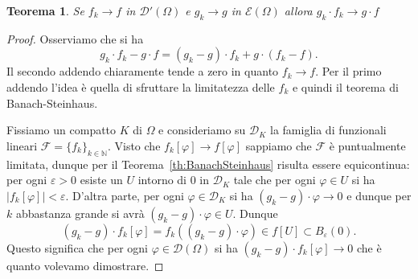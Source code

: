 \documentclass[italian,a4paper,oneside,headinclude]{scrbook}
\newcommand{\eps}{\varepsilon}
\renewcommand{\phi}{\varphi}
\newcommand{\D}{\mathcal D}
\newcommand{\E}{\mathcal E}
\newcommand{\F}{\mathcal F}
\newcommand{\NN}{\mathbb N}
\newcommand{\abs}[1]{{\left|#1\right|}}
\newtheorem{theorem}{Teorema}
\begin{document}
\begin{theorem}\label{th:distr_prod_conv}
  Se $f_k\to f$ in $\D'(\Omega)$ e $g_k\to g$ in $\E(\Omega)$
  allora $g_k\cdot f_k \to g\cdot f$
\end{theorem}
%
\begin{proof}
  Osserviamo che si ha
  \[
  g_k \cdot f_k - g\cdot f = (g_k -g) \cdot f_k + g\cdot (f_k-f).
  \]
  Il secondo addendo chiaramente tende a zero in quanto
  $f_k\to f$.
  Per il primo addendo l'idea è quella di sfruttare la limitatezza
  delle $f_k$ e quindi il teorema di Banach-Steinhaus.

  Fissiamo un compatto $K$ di $\Omega$ e consideriamo su $\D_K$ la
  famiglia di funzionali lineari $\F=\{ f_k\}_{k\in \NN}$.
  Visto che $f_k[\phi]\to f[\phi]$ sappiamo che $\F$ è puntualmente
  limitata, dunque per il Teorema~\ref{th:BanachSteinhaus} risulta
  essere equicontinua: per ogni $\eps>0$
  esiste un $U$ intorno di $0$ in $\D_K$ tale che
  per ogni $\phi \in U$ si ha $\abs{f_k[\phi]}< \eps$.
  D'altra parte, per ogni $\phi\in \D_K$ si ha $(g_k-g) \cdot \phi \to 0$ e
  dunque per $k$ abbastanza grande si avrà $(g_k-g)\cdot \phi \in U$.
  Dunque
  \[
    (g_k-g)\cdot f_k[\phi] = f_k((g_k-g)\cdot \phi) \in f[U] \subset B_\eps(0).
  \]
  Questo significa che per ogni $\phi \in \D(\Omega)$ si ha
  $(g_k-g)\cdot f_k[\phi]\to 0$ che è quanto volevamo dimostrare.
\end{proof}
\end{document}
